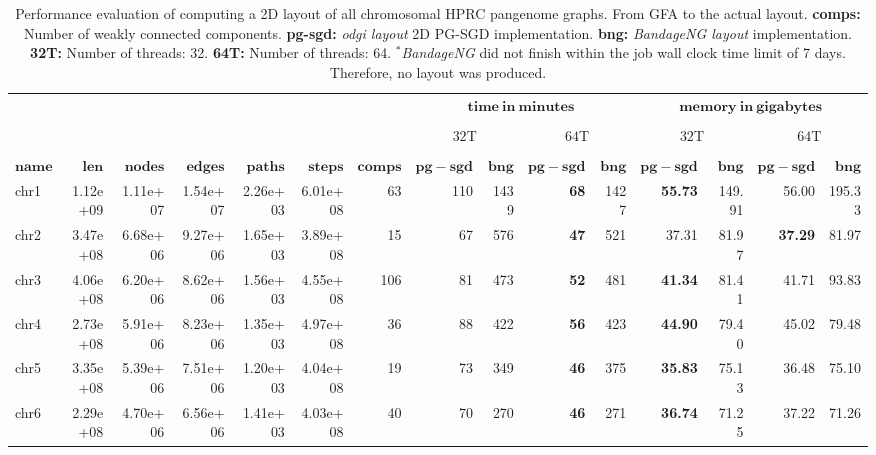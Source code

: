 \begin{table*}[!ht]
	\centering
	\caption{\label{tab:layout} Performance evaluation of computing a 2D layout of all chromosomal HPRC pangenome graphs. 
		From GFA to the actual layout. 
		\textbf{comps: } Number of weakly connected components.
		\textbf{pg-sgd:} \textit{odgi layout} 2D PG-SGD implementation.
		\textbf{bng:} \textit{BandageNG layout} implementation.
		\textbf{32T:} Number of threads: 32.
		\textbf{64T:} Number of threads: 64.
		$^{\boldsymbol{*}}$\textit{BandageNG} did not finish within the job wall clock time limit of 7 days. 
		Therefore, no layout was produced.}
	\begin{tabular}{@{}lrrrrrrrrrrrrrr@{}}
		& & & & & & &  \multicolumn{4}{c}{$\mathbf{time\ in\ minutes}$}  & \multicolumn{4}{c}{$\mathbf{memory\ in\ gigabytes}$}\\ 
	    \cmidrule(lr){8-11} \cmidrule(lr){12-15} \\
		& & & & & & & \multicolumn{2}{c}{$32$T} & \multicolumn{2}{c}{$64$T} & \multicolumn{2}{c}{$32$T} & \multicolumn{2}{c}{$64$T}\\
		\cmidrule(lr){8-9} \cmidrule(lr){10-11} \cmidrule(lr){12-13} \cmidrule(lr){14-15} \\
		{$\mathbf{name}$} & {$\mathbf{len}$} & {$\mathbf{nodes}$} & {$\mathbf{edges}$} & {$\mathbf{paths}$} & {$\mathbf{steps}$} & {$\mathbf{comps}$} & {$\mathbf{pg-sgd}$} & {$\mathbf{bng}$} & {$\mathbf{pg-sgd}$} & {$\mathbf{bng}$} & {$\mathbf{pg-sgd}$} & {$\mathbf{bng}$} & {$\mathbf{pg-sgd}$} & {$\mathbf{bng}$}\\ \hline
		chr1 & 1.12e+09 & 1.11e+07 & 1.54e+07 & 2.26e+03 & 6.01e+08 & 63 & 110 & 1439 &  \textbf{68} & 1427 & \textbf{55.73} & 149.91 & 56.00 & 195.33 \\ 
		chr2 & 3.47e+08 & 6.68e+06 & 9.27e+06 & 1.65e+03 & 3.89e+08 & 15 & 67 & 576 & \textbf{47} & 521 & 37.31 & 81.97 & \textbf{37.29} & 81.97 \\ 
		chr3 & 4.06e+08 & 6.20e+06 & 8.62e+06 & 1.56e+03 & 4.55e+08 & 106 & 81 & 473 & \textbf{52} & 481 & \textbf{41.34} & 81.41 & 41.71 & 93.83 \\ 
		chr4 & 2.73e+08 & 5.91e+06 & 8.23e+06 & 1.35e+03 & 4.97e+08 & 36 & 88 & 422 & \textbf{56} & 423 & \textbf{44.90} & 79.40 & 45.02 & 79.48 \\ 
		chr5 & 3.35e+08 & 5.39e+06 & 7.51e+06 & 1.20e+03 & 4.04e+08 & 19 & 73 & 349 & \textbf{46} & 375 & \textbf{35.83} & 75.13 & 36.48 & 75.10 \\ 
		chr6 & 2.29e+08 & 4.70e+06 & 6.56e+06 & 1.41e+03 & 4.03e+08 & 40 & 70 & 270 & \textbf{46} & 271 & \textbf{36.74} & 71.25 & 37.22 & 71.26 \\ 

\end{tabular}
\end{table*}
